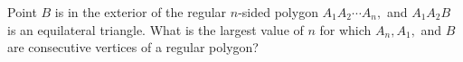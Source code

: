 Point $B$ is in the exterior of the regular $n$-sided polygon $A_1A_2\cdots A_n,$ and $A_1A_2B$ is an equilateral triangle.  What is the largest value of $n$ for which $A_n, A_1,$ and $B$ are consecutive vertices of a regular polygon?